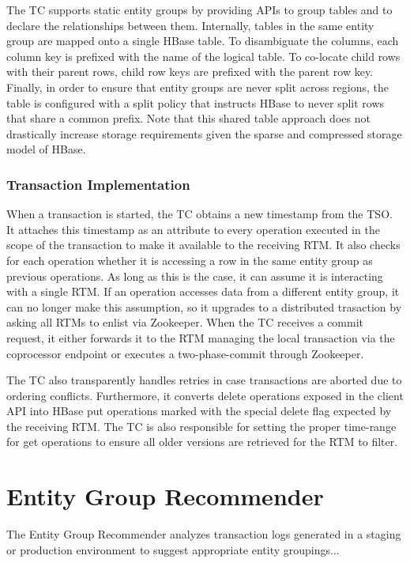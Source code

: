 \documentclass[10pt,final,journal]{IEEEtran}
\begin{document}
The TC supports static entity groups by providing APIs to group tables and to declare the relationships between them. Internally, tables in the same entity group are mapped onto a single HBase table. To disambiguate the columns, each column key is prefixed with the name of the logical table. To co-locate child rows with their parent rows, child row keys are prefixed with the parent row key. Finally, in order to ensure that entity groups are never split across regions, the table is configured with a split policy that instructs HBase to never split rows that share a common prefix. Note that this shared table approach does not drastically increase storage requirements given the sparse and compressed storage model of HBase.

\subsubsection{Transaction Implementation}
When a transaction is started, the TC obtains a new timestamp from the TSO. It attaches this timestamp as an attribute to every operation executed in the scope of the transaction to make it available to the receiving RTM. It also checks for each operation whether it is accessing a row in the same entity group as previous operations. As long as this is the case, it can assume it is interacting with a single RTM. If an operation accesses data from a different entity group, it can no longer make this assumption, so it upgrades to a distributed trasaction by asking all RTMs to enlist via Zookeeper. When the TC receives a commit request, it either forwards it to the RTM managing the local transaction via the coprocessor endpoint or executes a two-phase-commit through Zookeeper.

The TC also transparently handles retries in case transactions are aborted due to ordering conflicts. Furthermore, it converts delete operations exposed in the client API into HBase put operations marked with the special delete flag expected by the receiving RTM. The TC is also responsible for setting the proper time-range for get operations to ensure all older versions are retrieved for the RTM to filter.

\section{Entity Group Recommender}
The Entity Group Recommender analyzes transaction logs generated in a staging or production environment to suggest appropriate entity groupings...
\end{document}
